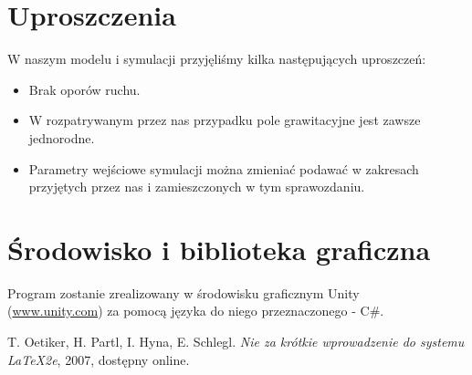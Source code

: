 \documentclass{classrep}
\begin{document}
\section{Uproszczenia}
W naszym modelu i symulacji przyjęliśmy kilka następujących uproszczeń:
\begin{itemize}
    \item Brak oporów ruchu.
    \item W rozpatrywanym przez nas przypadku pole grawitacyjne jest zawsze jednorodne.
    \item Parametry wejściowe symulacji można zmieniać podawać w zakresach przyjętych przez nas i zamieszczonych w tym sprawozdaniu.
\end{itemize}


\section{Środowisko i biblioteka graficzna}
Program zostanie zrealizowany w środowisku graficznym Unity\\ (\url{www.unity.com}) za pomocą języka do niego przeznaczonego - C\#.

\begin{thebibliography}{0}
   T. Oetiker, H. Partl, I. Hyna, E. Schlegl.
    \textsl{Nie za krótkie wprowadzenie do systemu \LaTeX2e}, 2007, dostępny
    online.
\end{thebibliography}
\end{document}
